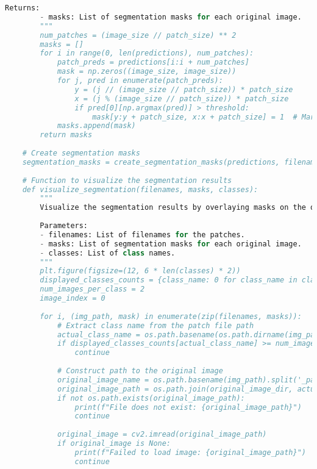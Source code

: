 \begin{lstlisting}[language=Python]
        Returns:
        - masks: List of segmentation masks for each original image.
        """
        num_patches = (image_size // patch_size) ** 2
        masks = []
        for i in range(0, len(predictions), num_patches):
            patch_preds = predictions[i:i + num_patches]
            mask = np.zeros((image_size, image_size))
            for j, pred in enumerate(patch_preds):
                y = (j // (image_size // patch_size)) * patch_size
                x = (j % (image_size // patch_size)) * patch_size
                if pred[0][np.argmax(pred)] > threshold:
                    mask[y:y + patch_size, x:x + patch_size] = 1  # Mark as area of interest
            masks.append(mask)
        return masks
    
    # Create segmentation masks
    segmentation_masks = create_segmentation_masks(predictions, filenames, patch_size, image_size)
    
    # Function to visualize the segmentation results
    def visualize_segmentation(filenames, masks, classes):
        """
        Visualize the segmentation results by overlaying masks on the original images.
    
        Parameters:
        - filenames: List of filenames for the patches.
        - masks: List of segmentation masks for each original image.
        - classes: List of class names.
        """
        plt.figure(figsize=(12, 6 * len(classes) * 2))
        displayed_classes_counts = {class_name: 0 for class_name in classes}
        num_images_per_class = 2
        image_index = 0
    
        for i, (img_path, mask) in enumerate(zip(filenames, masks)):
            # Extract class name from the patch file path
            actual_class_name = os.path.basename(os.path.dirname(img_path))
            if displayed_classes_counts[actual_class_name] >= num_images_per_class:
                continue
    
            # Construct path to the original image
            original_image_name = os.path.basename(img_path).split('_patch_')[0] + '.jpg'
            original_image_path = os.path.join(original_image_dir, actual_class_name, original_image_name)
            if not os.path.exists(original_image_path):
                print(f"File does not exist: {original_image_path}")
                continue
    
            original_image = cv2.imread(original_image_path)
            if original_image is None:
                print(f"Failed to load image: {original_image_path}")
                continue
    

\end{lstlisting}

